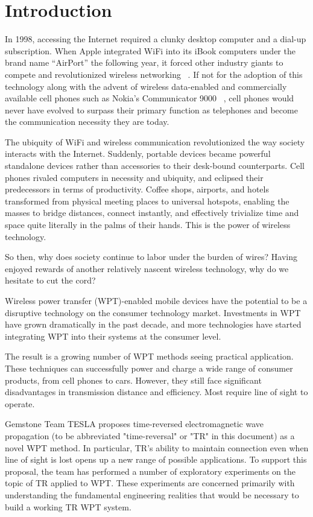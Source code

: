 \chapter{Introduction}
\label{ch:introduction}

In 1998, accessing the Internet required a clunky desktop computer and a dial-up
subscription. When Apple integrated WiFi into its iBook computers under the
brand name “AirPort” the following year, it forced other industry giants to
compete and revolutionized wireless networking ~\cite{_brief_2004}. If not for
the adoption of this technology along with the advent of wireless data-enabled
and commercially available cell phones such as Nokia’s Communicator 9000
~\cite{_first_1996}, cell phones would never have evolved to surpass their
primary function as telephones and become the communication necessity they are
today.

The ubiquity of WiFi and wireless communication revolutionized the way society
interacts with the Internet. Suddenly, portable devices became powerful
standalone devices rather than accessories to their desk-bound counterparts.
Cell phones rivaled computers in necessity and ubiquity, and eclipsed their
predecessors in terms of productivity. Coffee shops, airports, and hotels
transformed from physical meeting places to universal hotspots, enabling the
masses to bridge distances, connect instantly, and effectively trivialize time
and space quite literally in the palms of their hands. This is the power of
wireless technology.

So then, why does society continue to labor under the burden of wires? Having
enjoyed rewards of another relatively nascent wireless technology, why do we
hesitate to cut the cord?

Wireless power transfer (WPT)-enabled mobile devices have the potential to be a
disruptive technology on the consumer technology market.  Investments in WPT
have grown dramatically in the past decade, and more technologies have started
integrating WPT into their systems at the consumer level.

The result is a growing number of WPT methods seeing practical application.
These techniques can successfully power and charge a wide range of consumer
products, from cell phones to cars.  However, they still face significant
disadvantages in transmission distance and efficiency.  Most require line of
sight to operate.

Gemstone Team TESLA proposes time-reversed electromagnetic wave propagation (to
be abbreviated "time-reversal" or "TR" in this document) as a novel WPT method.
In particular, TR’s ability to maintain connection even when line of sight is
lost opens up a new range of possible applications.  To support this proposal,
the team has performed a number of exploratory experiments on the topic of TR
applied to WPT.  These experiments are concerned primarily with understanding
the fundamental engineering realities that would be necessary to build a working
TR WPT system.

